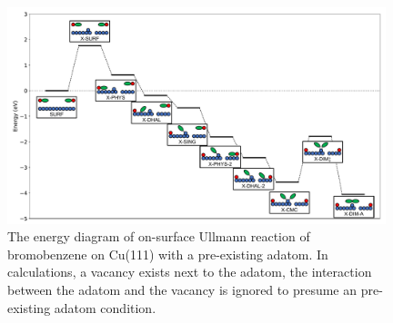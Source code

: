 \documentclass[%
 reprint,
 amsmath,amssymb,
 aps,
prb,
floatfix,
]{revtex4-2}
\newcommand{\comm}{\color{Purple}} %
\begin{document}
\begin{figure}[hbt]
\centering
\includegraphics[width=0.98\textwidth]{Fig/ullmann_adatom.pdf}
\caption{The energy diagram of on-surface Ullmann reaction of bromobenzene on Cu(111) with a pre-existing adatom. In calculations, a vacancy exists next to the adatom, the interaction between the adatom and the vacancy is ignored to presume an pre-existing adatom condition.} 
\label{fig:adatomullmann}
\end{figure}


\ifdefined\INTERNAL
\end{document}
